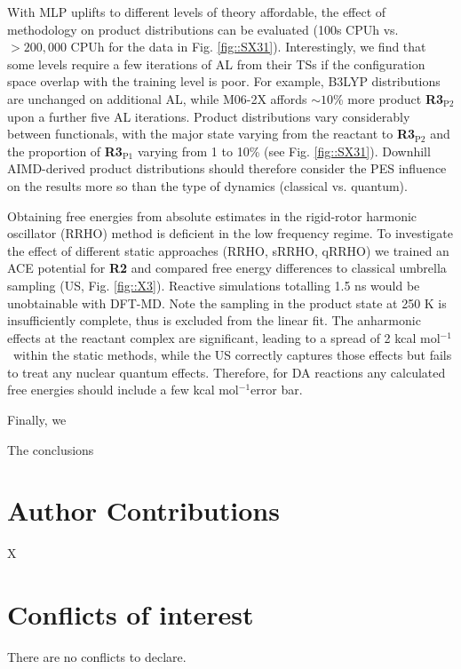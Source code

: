 \documentclass[twoside,twocolumn,9pt]{article}
\newcommand{\kcal}{kcal mol$^{-1}$}
\begin{document}
With MLP uplifts to different levels of theory affordable, the effect of methodology on product distributions can be evaluated (100s CPUh vs. $>200,000$ CPUh for the data in Fig. \ref{fig::SX31}).  Interestingly, we find that some levels require a few iterations of AL from their TSs if the configuration space overlap with the training level is poor. For example, B3LYP distributions are unchanged on additional AL, while M06-2X affords $\sim10$\% more product {\bfseries{R3$_\text{P2}$}} upon a further five AL iterations. Product distributions vary considerably between functionals, with the major state varying from the reactant to {\bfseries{R3$_\text{P2}$}} and the proportion of {\bfseries{R3$_\text{P1}$}} varying from 1 to 10\% (see Fig. \ref{fig::SX31}). Downhill AIMD-derived product distributions should therefore consider the PES influence on the results more so than the type of dynamics (classical vs. quantum).


Obtaining free energies from absolute estimates in the rigid-rotor harmonic oscillator (RRHO) method is deficient in the low frequency regime.\cite{Liu2017} To investigate the effect of different static approaches (RRHO, sRRHO,\cite{Ribeiro2011} qRRHO\cite{Grimme2012}) we trained an ACE potential for {\bfseries{R2}} and compared free energy differences to classical umbrella sampling (US, Fig. \ref{fig::X3}). Reactive simulations totalling 1.5 ns would be unobtainable with DFT-MD. Note the sampling in the product state at 250 K is insufficiently complete, thus is excluded from the linear fit. The anharmonic effects at the reactant complex are significant, leading to a spread of 2 \kcal~within the static methods, while the US correctly captures those effects but fails to treat any nuclear quantum effects. Therefore, for DA reactions any calculated free energies should include a few \kcal error bar.

Finally, we 




\vspace{0.2cm}
The conclusions 



\section*{Author Contributions}
X

\section*{Conflicts of interest}
There are no conflicts to declare.
\end{document}
